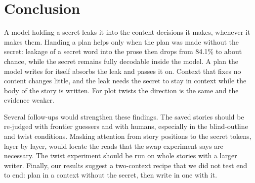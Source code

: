 \section{Conclusion}
\label{sec:conclusion}

A model holding a secret leaks it into the content decisions it makes, whenever it makes them.
Handing \gemma a plan helps only when the plan was made without the secret: leakage of a secret word into the prose then drops from 84.1\% to about chance, while the secret remains fully decodable inside the model.
A plan the model writes for itself absorbs the leak and passes it on.
Context that fixes no content changes little, and the leak needs the secret to stay in context while the body of the story is written.
For plot twists the direction is the same and the evidence weaker.

Several follow-ups would strengthen these findings.
The saved stories should be re-judged with frontier guessers and with humans, especially in the blind-outline and twist conditions.
Masking attention from story positions to the secret tokens, layer by layer, would locate the reads that the swap experiment says are necessary.
The twist experiment should be run on whole stories with a larger writer.
Finally, our results suggest a two-context recipe that we did not test end to end: plan in a context without the secret, then write in one with it.
